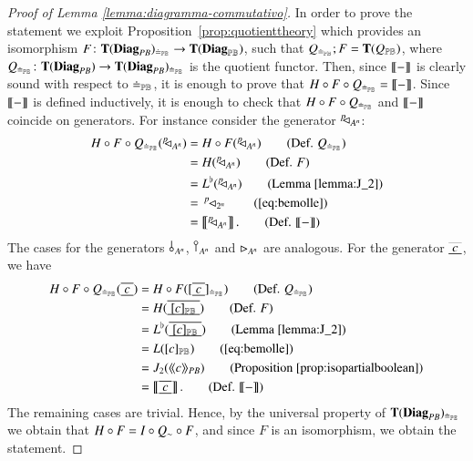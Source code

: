 \begin{proof}[Proof of Lemma \ref{lemma:diagramma-commutativo}]
    In order to prove the statement we exploit Proposition~\ref{prop:quotienttheory} which provides an isomorphism $F\colon\mathbf{T}(\mathbf{Diag}_{PB})_{\doteq_{\mathbb{PB}}} \to \mathbf{T}(\mathbf{Diag}_{\mathbb{PB}})$, such that $Q_{\doteq_{\mathbb{PB}}};F= {\mathbf{T}(Q_{\mathbb{PB}})}$, where $Q_{\doteq_{\mathbb{PB}}}\colon \mathbf{T}(\mathbf{Diag}_{PB}) \to \mathbf{T}(\mathbf{Diag}_{PB})_{\doteq_{\mathbb{PB}}}$ is the quotient functor.
     Then, since $\left \llbracket - \right \rrbracket$ is clearly sound with respect to ${\doteq_{\mathbb{PB}}}$, it is enough to prove that $H\circ F\circ Q_{\doteq_{\mathbb{PB}}} = \left \llbracket - \right \rrbracket$. Since $\left \llbracket - \right \rrbracket$ is defined inductively, it is enough to check that $H\circ F\circ Q_{\doteq_{\mathbb{PB}}}$ and $\left \llbracket - \right \rrbracket$ coincide on generators.
    For instance consider the generator $^p\!\! \lhd_{A^n}$:
    \begin{align*}
      \comp\circ F\circ Q_{\tapeeqPB}(\diagp{A^n})&= \comp\circ F(\diagp{A^n}) \tag{Def. $Q_{\tapeeqPB}$}\\
      &= \comp(\diagp{A^n}) \tag{Def. $F$}\\
      &=\jcompiso^\flat(\diagp{A^n}) \tag{Lemma \ref{lemma:J_2}}\\
      &=\, \diagp{2^n} \tag{\ref{eq:bemolle}}\\
      &=\dsem{\diagp{A^n}}. \tag{Def. $\dsem{-}$}
    \end{align*}
    The cases for the generators \,$\bangp{A^n}$, $\cobang{A^n}$ and $\rhd_{A^n}$ are analogous. For the generator $\tapeFunct{c}$, we have
    \begin{align}
      \comp\circ F\circ Q_{\tapeeqPB}(\tapeFunct{c})&= \comp\circ F([\tapeFunct{c}]_{\tapeeqPB}) \tag{Def. $Q_{\tapeeqPB}$}\\
      &= \comp(\tapeFunct{[c]_{\ThPB}}) \tag{Def. $F$}\\
      &=\jcompiso^\flat(\tapeFunct{[c]_{\ThPB}}) \tag{Lemma \ref{lemma:J_2}}\\
      &= \jcompiso([c]_{\ThPB}) \tag{\ref{eq:bemolle}}\\
      &=\ParJ_2(\osemPB{c}) \tag{Proposition \ref{prop:isopartialboolean}}\\
      &= \dsem{\tapeFunct{c}}. \tag{Def. $\dsem{-}$}
\end{align}
The remaining cases are trivial.
Hence, by the universal property of
$\mathbf{T}(\mathbf{Diag}_{PB})_{\doteq_{\mathbb{PB}}}$ we obtain that $H\circ F= I\circ Q_\sim\circ F$, and since $F$ is an isomorphism, we obtain the statement.
\end{proof}

